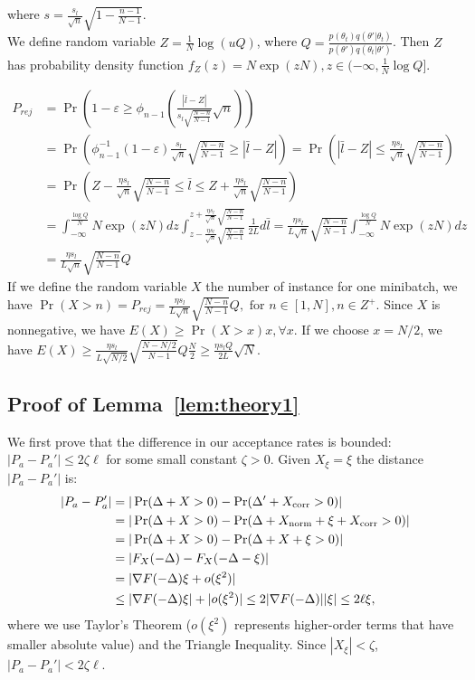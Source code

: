 \documentclass{article}
\begin{document}
where $s = \frac{s_l}{\sqrt{n}}\sqrt{1-\frac{n-1}{N-1}}$. \\
We define random variable $Z = \frac{1}{N}\log (uQ)$, where $Q=\frac{p(\theta_t)q(\theta'|\theta_t)}{p(\theta')q(\theta_t|\theta')}$. Then $Z$ has probability density function $f_Z(z) = N \exp(zN), z \in (-\infty, \frac{1}{N} \log Q]$.

\begin{align*} 
P_{rej}&=  \Pr \left( 1-\varepsilon \geq \phi_{n-1} \left( \frac{|\bar{l} - Z|}{s_l \sqrt{\frac{N-n}{N-1}}} \sqrt{n} \right) \right) \\ 
&=  \Pr \left(\phi^{-1}_{n-1} \left (1-\varepsilon \right) \frac{s_l }{\sqrt{n}} \sqrt{\frac{N-n}{N-1}} \geq |\bar{l} -Z| \right) = \Pr \left( |\bar{l} - Z| \leq \frac{\eta s_l}{\sqrt{n}}\sqrt{\frac{N-n}{N-1}} \right) \\
&= \Pr \left(Z - \frac{\eta s_l}{\sqrt{n}}\sqrt{\frac{N-n}{N-1}} \leq \bar{l} \leq Z + \frac{\eta s_l}{\sqrt{n}}\sqrt{\frac{N-n}{N-1}} \right) \\
&= \int_{-\infty} ^{\frac{\log Q}{N}} N \exp (zN)dz \int_{z - \frac{\eta s_l}{\sqrt{n}}\sqrt{\frac{N-n}{N-1}}} ^{z+ \frac{\eta s_l}{\sqrt{n}}\sqrt{\frac{N-n}{N-1}}} \frac{1}{2L} d\bar{l} = \frac{\eta s_l}{L\sqrt{n}}\sqrt{\frac{N-n}{N-1}} \int_{-\infty} ^{\frac{\log Q}{N}} N \exp(zN) dz \\
&= \frac{\eta s_l}{L\sqrt{n}}\sqrt{\frac{N-n}{N-1}} Q
\end{align*}
 If we define the random variable $X$ the number of instance for one minibatch, we have $\Pr (X>n) = P_{rej} = \frac{\eta s_l}{L\sqrt{n}}\sqrt{\frac{N-n}{N-1}} Q, \mbox{ for } n \in [1,N], n \in Z^+$. Since $X$ is nonnegative, we have $E(X) \geq \Pr (X >x)x, \forall x$. If we choose $x=N/2$, we have $E(X) \geq \frac{\eta s_l}{L\sqrt{N/2}}\sqrt{\frac{N-N/2}{N-1}} Q \frac{N}{2} \geq \frac{\eta s_{l}Q}{2L}\sqrt{N}$.

\subsection{Proof of Lemma~\ref{lem:theory1}}\label{app:theory1}

We first prove that the difference in our acceptance rates is bounded: $|P_a - P_a'| \leq 2\zeta
\ell$ for some small constant $\zeta > 0$. Given $X_\xi = \xi$ the distance $|P_a - P_a'|$ is:
\begin{align*}
|P_a - P_a'| &= |\Pr(\Delta + X >0) - \Pr(\Delta' + X_{\rm corr} > 0)|\\
& = | \Pr (\Delta + X > 0) - \Pr (\Delta + X_{\rm norm} + \xi + X_{\rm corr} >0) |    \\
&= |\Pr (\Delta + X > 0) -\Pr(\Delta + X + \xi >0)| \\
&= |F_X(-\Delta)- F_X(-\Delta - \xi)| \\
&= |\nabla F(-\Delta) \xi + o(\xi^2)|\\
&\leq  |\nabla F(-\Delta) \xi| +| o(\xi^2)| \leq 2|\nabla F(-\Delta)| |\xi| \leq 2\ell \xi,
\end{align*}
where we use Taylor's Theorem ($o(\xi^2)$ represents higher-order terms that have smaller absolute
value) and the Triangle Inequality.  Since $|X_\xi| < \zeta$, $|P_a - P_a'| < 2 \zeta \ell$.
\end{document}
